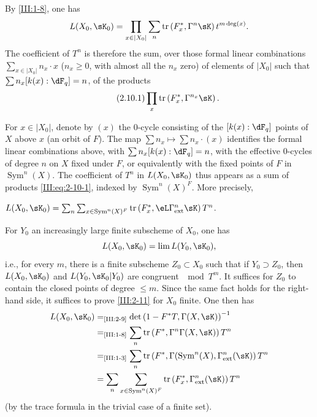 By \ref{III:1-8}, one has
\[
  L(X_0,\sK_0) = \prod_{x\in |X_0|} \sum_n \tr\left(F_x^*,\Gamma^n\sK\right) t^{m\deg(x)} \text{.}
\]
The coefficient of $T^n$ is therefore the sum, over those formal linear
combinations $\sum_{x\in |X_0|} n_x\cdot x$ ($n_x\geqslant 0$, with almost
all the $n_x$ zero) of elements of $|X_0|$ such that
$\sum n_x [k(x):\dF_q] = n$, of the products
\begin{equation*}\tag{2.10.1}\label{III:eq:2-10-1}
  \prod_x \tr\left(F_x^*,\Gamma^{n_x} \sK\right) \text{.}
\end{equation*}

For $x\in |X_0|$, denote by $(x)$ the $0$-cycle consisting of the
$[k(x):\dF_q]$ points of $X$ above $x$ (an orbit of $F$). The map
$\sum n_x\mapsto \sum n_x\cdot (x)$ identifies the formal linear combinations
above, with $\sum n_x [k(x):\dF_q]=n$, with the effective $0$-cycles of degree
$n$ on $X$ fixed under $F$, or equivalently with the fixed points of $F$ in
$\operatorname{Sym}^n(X)$. The coefficient of $T^n$ in $L(X_0,\sK_0)$ thus
appears as a sum of products \eqref{III:eq:2-10-1}, indexed by
$\operatorname{Sym}^n(X)^F$. More precisely,





\begin{lemma_}\label{III:2-11}
 $L(X_0,\sK_0) = \sum_n \sum_{x\in\operatorname{Sym}^n(X)^F} \tr\left(F_x^*,\eL\Gamma_\textnormal{ext}^n \sK\right) T^n$.
\end{lemma_}

For $Y_0$ an increasingly large finite subscheme of $X_0$, one has
\[
  L(X_0,\sK_0) = \lim L(Y_0,\sK_0) \text{,}
\]
i.e., for every $m$, there is a finite subscheme $Z_0\subset X_0$ such that
if $Y_0\supset Z_0$, then $L(X_0,\sK_0)$ and $L(Y_0,\sK_0|Y_0)$ are congruent
$\mod T^m$.
It suffices for $Z_0$ to contain the closed points of degree $\leqslant m$.
Since the same fact holds for the right-hand side, it suffices to prove
\ref{III:2-11} for $X_0$ finite. One then has
\begin{align*}
  L(X_0,\sK_0)
    &=_\text{\ref{III:2-9}} \det\left(1-F^* T,\Gamma(X,\sK)\right)^{-1} \\
    &=_\text{\ref{III:1-8}} \sum_n \tr\left(F^*,\Gamma^n \Gamma(X,\sK)\right) T^n \\
    &=_\text{\ref{III:1-3}} \sum_n \tr\left(F^*,\Gamma(\operatorname{Sym}^n(X),\Gamma_\text{ext}^n(\sK)\right) T^n \\
    &= \sum_n \sum_{x\in \operatorname{Sym}^n(X)^F} \tr\left(F_x^*,\Gamma_\text{ext}^n(\sK)\right) T^n
\end{align*}
(by the trace formula in the trivial case of a finite set).






